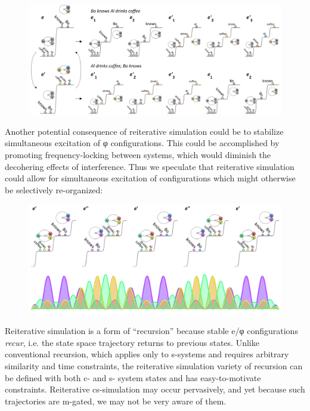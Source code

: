   
\begin{figure}
\includegraphics[width=\textwidth]{figures/Tilsen-img116.png}
\caption{\missingcaption}
\label{fig:}
\end{figure}
 

  Another potential consequence of reiterative simulation could be to stabilize simultaneous excitation of φ configurations. This could be accomplished by promoting frequency-locking between systems, which would diminish the decohering effects of interference. Thus we speculate that reiterative simulation could allow for simultaneous excitation of configurations which might otherwise be selectively re-organized:

  
\begin{figure}
\includegraphics[width=\textwidth]{figures/Tilsen-img117.png}
\caption{\missingcaption}
\label{fig:}
\end{figure}
 

  Reiterative simulation is a form of “recursion” because stable e/φ configurations \textit{recur}, i.e. the state space trajectory returns to previous states. Unlike conventional recursion, which applies only to s-systems and requires arbitrary similarity and time constraints, the reiterative simulation variety of recursion can be defined with both c- and s- system states and has easy-to-motivate constraints. Reiterative cs-simulation may occur pervasively, and yet because such trajectories are m-gated, we may not be very aware of them. 

